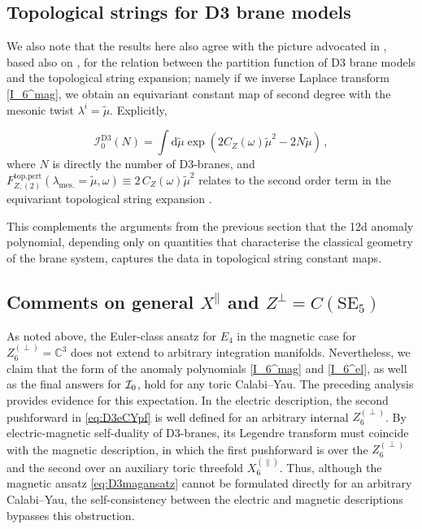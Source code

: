 \documentclass[11pt,a4paper]{article}
\def\cI{{\cal I}}
\theoremstyle{definition}
\theoremstyle{identity}
\theoremstyle{remark}
\newcommand{\BC}{\mathbb{C}}
\begin{document}
\subsection*{Topological strings for D3 brane models}

We also note that the results here also agree with the picture advocated in \cite{Cassia:2025jkr}, based also on \cite{Martelli:2023oqk,Colombo:2023fhu}, for the relation between the partition function of D3 brane models and the topological string expansion; namely if we inverse Laplace transform \eqref{I_6^mag}, we  obtain an equivariant constant map of second degree with the mesonic twist $\lambda^i=\tilde{\mu}$. Explicitly,

\begin{equation}
    \mathcal{I}_0^{\text{D3}}(N)=\int\text{d}\tilde{\mu}\exp\left(2C_Z(\omega)\tilde{\mu}^2-2N\tilde{\mu}\right)\,,
\end{equation}
where $N$ is directly the number of D3-branes, and $F^{\text{top,pert}}_{Z,(2)}(\lambda_{\text{mes.}}=\tilde{\mu},\omega)\equiv 2\, C_Z(\omega)\tilde{\mu}^2$ relates to the second order term in the equivariant topological string expansion \cite{Cassia:2025jkr}. 

This complements the arguments from the previous section that the 12d anomaly polynomial, depending only on quantities that characterise the classical geometry of the brane system, captures the data in topological string constant maps.

\subsection{Comments on general $X^{\parallel}$ and $Z^\perp=C(\text{SE}_5)$}
\label{sec:4.3}

As noted above, the Euler-class ansatz for $E_4$ in the magnetic case for $Z_6^{(\perp)}=\BC^3$  does not extend to arbitrary integration manifolds. Nevertheless, we claim that the form of the anomaly polynomials \eqref{I_6^mag} and \eqref{I_6^el}, as well as the final answers for $\cI_0$, hold for any toric Calabi--Yau. The preceding analysis provides evidence for this expectation. In the electric description, the second pushforward in \eqref{eq:D3eCYpf} is well defined for an arbitrary internal $Z^{(\perp)}_6$. By electric-magnetic self-duality of D3-branes, its Legendre transform must coincide with the magnetic description, in which the first pushforward is over the $Z^{(\perp)}_6$ and the second over an auxiliary toric threefold $X_6^{(\parallel)}$. Thus, although the magnetic ansatz \eqref{eq:D3magansatz} cannot be formulated directly for an arbitrary Calabi--Yau, the self-consistency between the electric and magnetic descriptions bypasses this obstruction.
\end{document}
